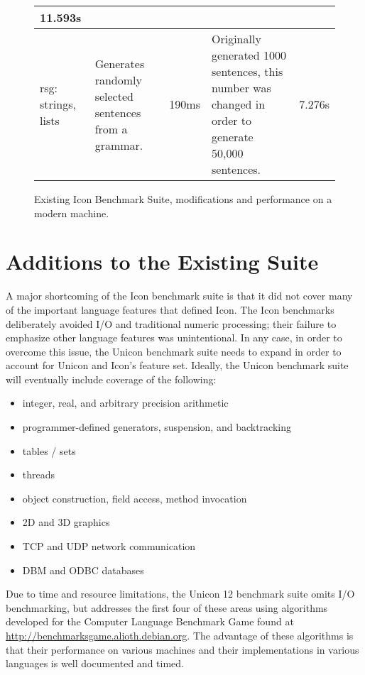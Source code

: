 \documentclass[letterpaper,12pt]{article}
\newcommand{\squeezeup}{\vspace{-1em}}
\begin{document}
\begin{figure}[h]
\begin{center}
{\begin{tabular}{ | p{2cm} | p{4cm} | p{.8cm} | p{5cm} | p{1.5cm} |}
        11.593s
        \\ \hline
        rsg: strings, lists &  
        Generates randomly selected sentences from a grammar. \cite{griswold:newsletter} & 
        190ms & 
        Originally generated 1000 sentences, this number 
        was changed in order to generate 50,000 sentences. & 
        7.276s 
        \\ \hline
      \end{tabular}
    \squeezeup
    }
  \end{center}
  \caption{Existing Icon Benchmark Suite, modifications and
    performance on a modern machine.}
  \label{fig}
\end{figure}

\section{Additions to the Existing Suite}

A major shortcoming of the Icon benchmark suite is that it did not
cover many of the important language features that defined Icon.
The Icon benchmarks deliberately avoided I/O and traditional numeric
processing; their failure to emphasize other language features was
unintentional. In any case, in order to overcome this issue, the
Unicon benchmark suite needs to expand in order to account for 
Unicon and Icon's feature set. Ideally, the Unicon benchmark suite 
will eventually include coverage of the following:

  \squeezeup
\begin{itemize}[noitemsep]
  \renewcommand{\labelitemi}{$\circ$}
\item integer, real, and arbitrary precision arithmetic
\item programmer-defined generators, suspension, and backtracking
\item tables / sets
\item threads
\item object construction, field access, method invocation
\item 2D and 3D graphics
\item TCP and UDP network communication
\item DBM and ODBC databases
\end{itemize}  
  \squeezeup

Due to time and resource limitations, the Unicon 12 benchmark suite
omits I/O benchmarking, but addresses the first four of these areas 
using algorithms developed for the Computer Language Benchmark Game 
found at \url{http://benchmarksgame.alioth.debian.org}. 
The advantage of these algorithms is that their performance on various 
machines and their implementations in various languages is well documented 
and timed. 
\end{document}
